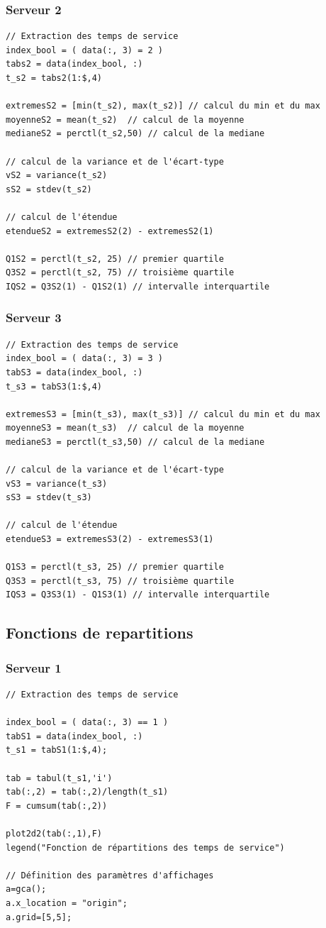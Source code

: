 \documentclass{article}
\begin{document}
\subsubsection{Serveur 2}
\begin{verbatim}
// Extraction des temps de service
index_bool = ( data(:, 3) = 2 )
tabs2 = data(index_bool, :)
t_s2 = tabs2(1:$,4)

extremesS2 = [min(t_s2), max(t_s2)] // calcul du min et du max
moyenneS2 = mean(t_s2)  // calcul de la moyenne
medianeS2 = perctl(t_s2,50) // calcul de la mediane

// calcul de la variance et de l'écart-type
vS2 = variance(t_s2)
sS2 = stdev(t_s2)

// calcul de l'étendue
etendueS2 = extremesS2(2) - extremesS2(1)

Q1S2 = perctl(t_s2, 25) // premier quartile
Q3S2 = perctl(t_s2, 75) // troisième quartile
IQS2 = Q3S2(1) - Q1S2(1) // intervalle interquartile
\end{verbatim}

\subsubsection{Serveur 3}
\begin{verbatim}
// Extraction des temps de service
index_bool = ( data(:, 3) = 3 )
tabS3 = data(index_bool, :)
t_s3 = tabS3(1:$,4)

extremesS3 = [min(t_s3), max(t_s3)] // calcul du min et du max
moyenneS3 = mean(t_s3)  // calcul de la moyenne
medianeS3 = perctl(t_s3,50) // calcul de la mediane

// calcul de la variance et de l'écart-type
vS3 = variance(t_s3)
sS3 = stdev(t_s3)

// calcul de l'étendue
etendueS3 = extremesS3(2) - extremesS3(1)

Q1S3 = perctl(t_s3, 25) // premier quartile
Q3S3 = perctl(t_s3, 75) // troisième quartile
IQS3 = Q3S3(1) - Q1S3(1) // intervalle interquartile
\end{verbatim}

\subsection{Fonctions de repartitions}

\subsubsection{Serveur 1}
\begin{verbatim}
// Extraction des temps de service

index_bool = ( data(:, 3) == 1 )
tabS1 = data(index_bool, :)
t_s1 = tabS1(1:$,4);

tab = tabul(t_s1,'i')
tab(:,2) = tab(:,2)/length(t_s1)
F = cumsum(tab(:,2))

plot2d2(tab(:,1),F)
legend("Fonction de répartitions des temps de service")

// Définition des paramètres d'affichages
a=gca();
a.x_location = "origin";
a.grid=[5,5];
\end{verbatim}
\end{document}
